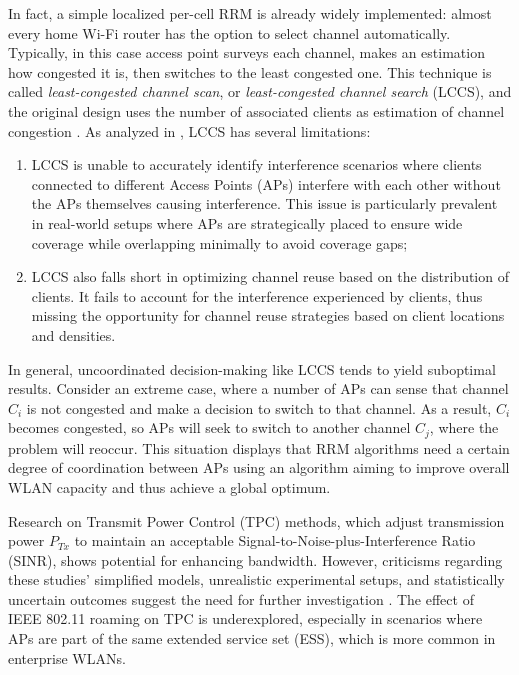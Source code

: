 In fact, a simple localized per-cell RRM is already widely implemented: almost every home Wi-Fi router has the option to select channel automatically. Typically, in this case access point surveys each channel, makes an estimation how congested it is, then switches to the least congested one. This technique is called \textit{least-congested channel scan}, or \textit{least-congested channel search} (LCCS), and the original design uses the number of associated clients as estimation of channel congestion \cite{achantaMethodApparatusLeast2006}.
As analyzed in \cite{aruneshmishraWeightedColoringBased2005}, LCCS has several limitations:
\begin{enumerate}
    \item LCCS is unable to accurately identify interference scenarios where clients connected to different Access Points (APs) interfere with each other without the APs themselves causing interference. This issue is particularly prevalent in real-world setups where APs are strategically placed to ensure wide coverage while overlapping minimally to avoid coverage gaps;
    \item LCCS also falls short in optimizing channel reuse based on the distribution of clients. It fails to account for the interference experienced by clients, thus missing the opportunity for channel reuse strategies based on client locations and densities.
\end{enumerate}

In general, uncoordinated decision-making like LCCS tends to yield suboptimal results. Consider an extreme case, where a number of APs can sense that channel $C_i$ is not congested and make a decision to switch to that channel. As a result, $C_i$ becomes congested, so APs will seek to switch to another channel $C_j$, where the problem will reoccur. This situation displays that RRM algorithms need a certain degree of coordination between APs using an algorithm aiming to improve overall WLAN capacity and thus achieve a global optimum.

Research on Transmit Power Control (TPC) methods, which adjust transmission power $P_{Tx}$ to maintain an acceptable Signal-to-Noise-plus-Interference Ratio (SINR), shows potential for enhancing bandwidth. However, criticisms regarding these studies' simplified models, unrealistic experimental setups, and statistically uncertain outcomes suggest the need for further investigation \cite{michalskiSimplePerformanceboostingAlgorithm2016,kazminIspolzovanieNeyronnyhSetey2021}. The effect of IEEE 802.11 roaming on TPC is underexplored, especially in scenarios where APs are part of the same extended service set (ESS), which is more common in enterprise WLANs.

